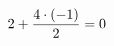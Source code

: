 \documentclass[preview]{standalone}
\begin{document}
\begin{align*}
\special{dvisvgm:raw <g id='unique000'>}2 +\frac{4 \cdot (-1)}{2} = 0\special{dvisvgm:raw </g>}
\end{align*}
\end{document}
